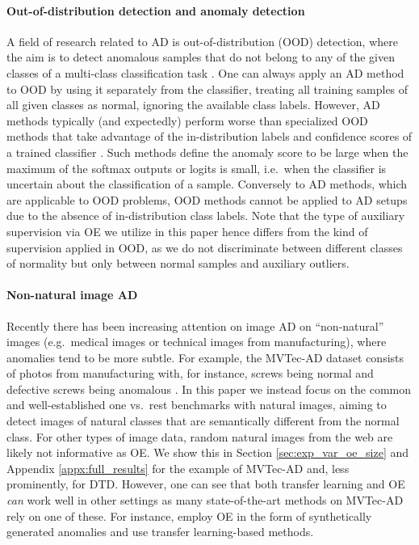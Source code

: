 \documentclass[10pt]{article} \usepackage[accepted]{stylefiles/tmlr}
\begin{document}
\paragraph{Out-of-distribution detection and anomaly detection}
A field of research related to AD is out-of-distribution (OOD) detection, where the aim is to detect anomalous samples that do not belong to any of the given classes of a multi-class classification task \citep{lee2018training}.
One can always apply an AD method to OOD by using it separately from the classifier, treating all training samples of all given classes as normal, ignoring the available class labels. 
However, AD methods typically (and expectedly) perform worse than specialized OOD methods that take advantage of the in-distribution labels and confidence scores of a trained classifier \citep{liang2018enhancing, tack2020, hendrycks2022scaling}.
Such methods define the anomaly score to be large when the maximum of the softmax outputs \citep{liang2018enhancing} or logits \citep{hendrycks2022scaling} is small, i.e.~when the classifier is uncertain about the classification of a sample.
Conversely to AD methods, which are applicable to OOD problems, OOD methods cannot be applied to AD setups due to the absence of in-distribution class labels.
Note that the type of auxiliary supervision via OE we utilize in this paper hence differs from the kind of supervision applied in OOD, as we do not discriminate between different classes of normality but only between normal samples and auxiliary outliers. 

\paragraph{Non-natural image AD}
Recently there has been increasing attention on image AD on ``non-natural'' images (e.g.\ medical images or technical images from manufacturing), where anomalies tend to be more subtle.
For example, the MVTec-AD dataset consists of photos from manufacturing with, for instance, screws being normal and defective screws being anomalous \citep{bergmann2019mvtec}.
In this paper we instead focus on the common and well-established one vs.~rest benchmarks with natural images, aiming to detect images of natural classes that are semantically different from the normal class.
For other types of image data, random natural images from the web are likely not informative as OE.
We show this in Section \ref{sec:exp_var_oe_size} and Appendix \ref{appx:full_results} for the example of MVTec-AD and, less prominently, for DTD.
However, one can see that both transfer learning and OE \emph{can} work well in other settings as many state-of-the-art methods on MVTec-AD rely on one of these. 
For instance, \cite{liznerski2021, schluter2021self, li2021cutpaste} employ OE in the form of synthetically generated anomalies and \cite{defard2021padim,gudovskiy2022cflow,roth2022towards} use transfer learning-based methods.
\end{document}
